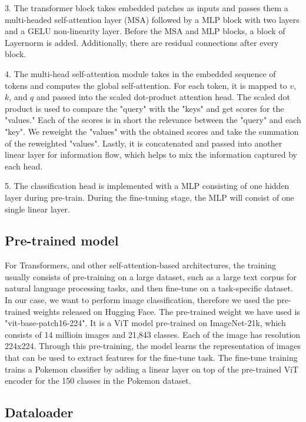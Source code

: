 \documentclass{article} %
\begin{document}
3. The transformer block takes embedded patches as inputs and passes them a multi-headed self-attention layer (MSA)
followed by a MLP block with two layers and a GELU non-linearity layer. Before the MSA and MLP blocks, a block of Layernorm is added.
Additionally, there are residual connections after every block.

4. The multi-head self-attention module takes in the embedded sequence of tokens and computes the global self-attention.
For each token, it is mapped to $v$, $k$, and $q$ and passed into the scaled dot-product attention head.
The scaled dot product is used to compare the "query" with the "keys" and get scores for the "values."
Each of the scores is in short the relevance between the "query" and each "key".
We reweight the "values" with the obtained scores and take the summation of the reweighted "values".
Lastly, it is concatenated and passed into another linear layer for information flow, which helps to mix the information captured by each head.

5. The classification head is implemented with a MLP consisting of one hidden layer during pre-train.
During the fine-tuning stage, the MLP will consist of one single linear layer.



\subsection{Pre-trained model}
For Transformers, and other self-attention-based architectures, the training usually consists of pre-training on 
a large dataset, such as a large text corpus for natural language processing tasks, and then fine-tune on a 
task-specific dataset. In our case, we want to perform image classification, therefore we used the pre-trained weights
released on Hugging Face. The pre-trained weight we have used is "vit-base-patch16-224". It is a ViT model pre-trained
on ImageNet-21k, which consists of 14 millioin images and 21,843 classes. Each of the image has resolution 224x224.
Through this pre-training, the model learns the representation of images that can be used to extract features for the
fine-tune task. The fine-tune training trains a Pokemon classifier by adding a linear layer on top of the pre-trained
ViT encoder for the 150 classes in the Pokemon dataset.

\subsection{Dataloader} %
\end{document}
